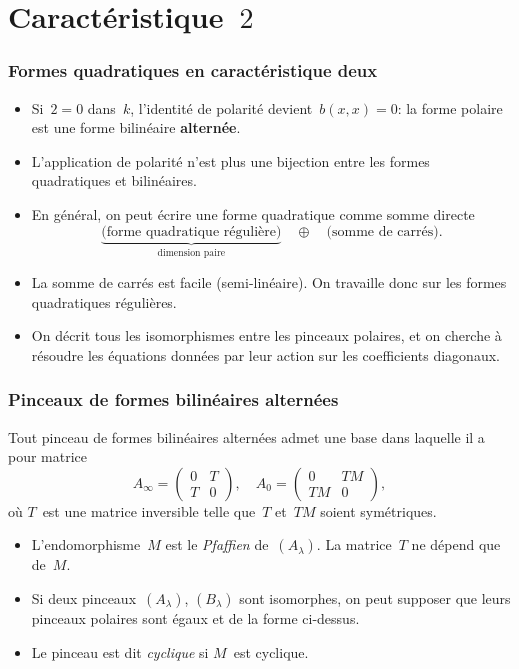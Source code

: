 \documentclass{beamer}%
\def\strong#1{{\bf\color{rouge}#1}}
\def\emphz#1{\emph{{\color{bleu}#1}}}
\def\mat#1{\begin{pmatrix}#1\end{pmatrix}}
\begin{document}
\section{Caractéristique~$2$}
\begin{frame}\frametitle{Formes quadratiques en caractéristique deux}%

\begin{itemize}
\item Si~$2 = 0$ dans~$k$, l'identité de polarité devient~$b(x,x) = 0$:
la forme polaire est une forme bilinéaire \strong{alternée}.
\item L'application de polarité n'est plus une bijection entre les formes
quadratiques et bilinéaires.
\item En général, on peut écrire une forme quadratique comme somme
directe
\begin{equation*}
\underbrace{\text{(forme quadratique régulière)}}_{\text{dimension
paire}} \quad ⊕ \quad \text{(somme de carrés)}.
\end{equation*}
\item La somme de carrés est facile (semi-linéaire). On travaille donc
sur les formes quadratiques régulières.
\item On décrit tous les isomorphismes entre les pinceaux polaires, et on
cherche à résoudre les équations données par leur action sur les
coefficients diagonaux.
\end{itemize}
\end{frame}%
\begin{frame}\frametitle{Pinceaux de formes bilinéaires alternées}%
Tout pinceau de formes bilinéaires alternées admet une base dans laquelle
il a pour matrice
\begin{equation*}
A_{∞} = \mat{0 & T\\T & 0}, \quad A_{0} = \mat{0 & TM\\TM & 0},
\end{equation*}
où $T$~est une matrice inversible telle que~$T$ et~$TM$ soient
symétriques.

\begin{itemize}
\item
L'endomorphisme~$M$ est le \emphz{Pfaffien} de~$(A_{λ})$. La matrice~$T$
ne dépend que de~$M$.
\item
Si deux pinceaux~$(A_{λ})$, $(B_{λ})$ sont isomorphes, on peut supposer
que leurs pinceaux polaires sont égaux et de la forme ci-dessus.
\item Le pinceau est dit \emphz{cyclique} si $M$~est cyclique.
\end{itemize}
\end{frame}%
\end{document}
